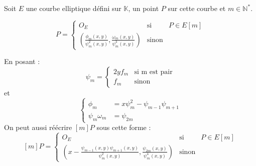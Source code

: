 \documentclass{article}
\begin{document}
\begin{thm}
Soit $E$ une courbe elliptique défini sur $\mathbb{K}$, un point $P$ sur cette courbe et $m \in \mathbb{N}^*$.

\begin{equation}
[m]P = 
\left\lbrace
\begin{array}{ccc}
O_E & \mbox{si} & P \in E[m]  \\
\left(    \frac{\phi_m(x,y)}{\psi^2_m(x,y)}, \frac{\omega_m(x,y)}{\psi^3_m(x,y)}\right) & \mbox{sinon}  & 
\end{array}\right.
\end{equation}

En posant : 
\begin{equation*}
\psi_m= \left\lbrace
\begin{array}{cc}
2yf_m & \mbox{si m est pair} \\
f_m & \mbox{sinon}
\end{array}\right.
\end{equation*}
et 
\begin{equation*}
\left\lbrace
\begin{array}{ll}
\phi_m &= x \psi^2_m - \psi_{m-1}\psi_{m+1} \\
\psi_m \omega_m &= \psi_{2m}
\end{array}\right.
\end{equation*}
On peut aussi réécrire $[m]P$ sous cette forme : 
\begin{equation}\label{mP}
[m]P = \left\lbrace
\begin{array}{lll}
O_E & \mbox{si} & P \in E[m]  \\
\left(  x -   \frac{\psi_{m-1}(x,y)\psi_{m+1}(x,y)}{\psi^2_m(x,y)}, \frac{\psi_{2m}(x,y)}{\psi^4_m(x,y)}\right) & \mbox{sinon}  & 
\end{array}\right.
\end{equation}
\end{thm}
\end{document}
